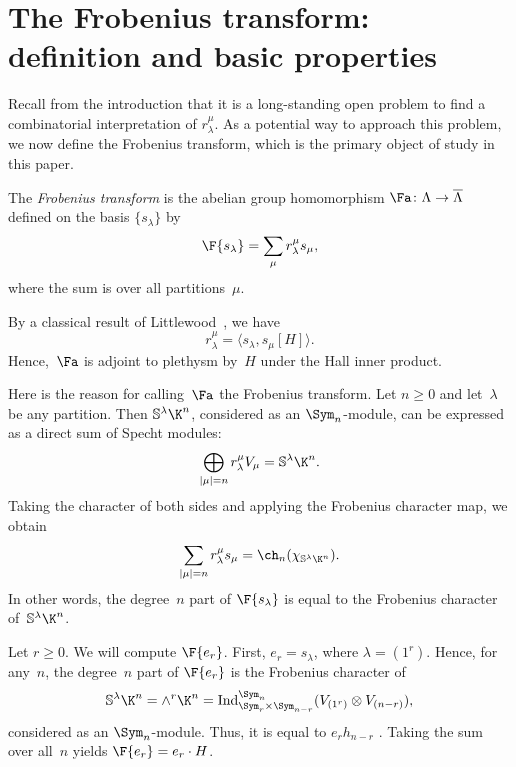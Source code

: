 \section{The Frobenius transform: definition and basic properties}
\label{section:basics}
Recall from the introduction that it is a long-standing open problem to find a combinatorial interpretation of $r_\lambda^\mu$. As a potential way to approach this problem, we now define the Frobenius transform, which is the primary object of study in this paper.
\begin{defi}
    The \emph{Frobenius transform} is the abelian group homomorphism $\Fa \colon \Lambda \to \overline{\Lambda}$ defined on the basis $\{s_\lambda\}$ by \[\F{s_\lambda} = \sum_\mu r_{\lambda}^\mu s_\mu,\] where the sum is over all partitions~$\mu$.
\end{defi}
\begin{rema}\label{remark:halladjoint}
By a classical result of Littlewood~\cite{MR1576896}, we have \[r_\lambda^\mu = \langle s_\lambda, s_\mu[H] \rangle.\] Hence,~$\Fa$ is adjoint to plethysm by~$H$ under the Hall inner product.
\end{rema}
Here is the reason for calling~$\Fa$ the Frobenius transform. Let $n \geq 0$ and let~$\lambda$ be any partition. Then $\mathbb{S}^\lambda \K^n$, considered as an $\Sym_n$-module, can be expressed as a direct sum of Specht modules:
\[\bigoplus_{|\mu| = n} r_{\lambda}^\mu V_\mu = \mathbb{S}^\lambda \K^n.\]
Taking the character of both sides and applying the Frobenius character map, we obtain \begin{equation}\label{equation:fslambdan1}\sum_{|\mu| = n} r_{\lambda}^\mu s_\mu = \ch_n(\chi_{\mathbb{S}^\lambda \K^n}).\end{equation} In other words, the degree~$n$ part of $\F{s_\lambda}$ is equal to the Frobenius character of~$\mathbb{S}^\lambda \K^n$.

\begin{exam}\label{example:fer}
    Let $r \geq 0$. We will compute $\F{e_r}$. First, $e_r = s_{\lambda}$, where $\lambda = (1^r)$. Hence, for any~$n$, the degree~$n$ part of $\F{e_r}$ is the Frobenius character of \[\mathbb{S}^{\lambda} \K^n = \wedge^r \K^n = \operatorname{Ind}_{\Sym_r \times \Sym_{n - r}}^{\Sym_n} (V_{(1^r)} \otimes V_{(n-r)}),\] considered as an $\Sym_n$-module. Thus, it is equal to $e_r h_{n - r}$ \cite[Proposition~7.18.2]{MR4621625}. Taking the sum over all~$n$ yields $\F{e_r} = e_r \cdot H$.
\end{exam}

